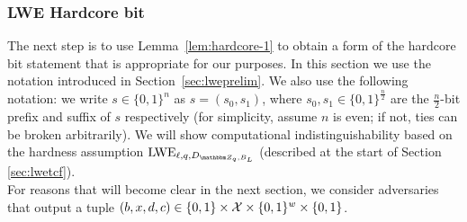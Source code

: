 

\subsubsection{LWE Hardcore bit}
\label{sec:lwehc}

The next step is to use Lemma~\ref{lem:hardcore-1} to obtain a form of the hardcore bit statement that is appropriate for our purposes. In this section we use the notation introduced in Section~\ref{sec:lweprelim}. We also use the following notation: we write $s\in\{0,1\}^n$ as $s = (s_0,s_1)$, where $s_0,s_1\in\{0,1\}^{\frac{n}{2}}$ are the $\frac{n}{2}$-bit prefix and suffix of $s$ respectively (for simplicity, assume $n$ is even; if not, ties can be broken arbitrarily). We will show computational indistinguishability based on the hardness assumption $\lwe_{\ell,q,D_{\mZ_q,B_L}}$ (described at the start of Section \ref{sec:lwetcf}).\\ 

For reasons that will become clear in the next section, we consider adversaries that output a tuple $(b,x,d,c)\in \{0,1\}\times \mathcal{X}\times \{0,1\}^w \times \{0,1\}$.

